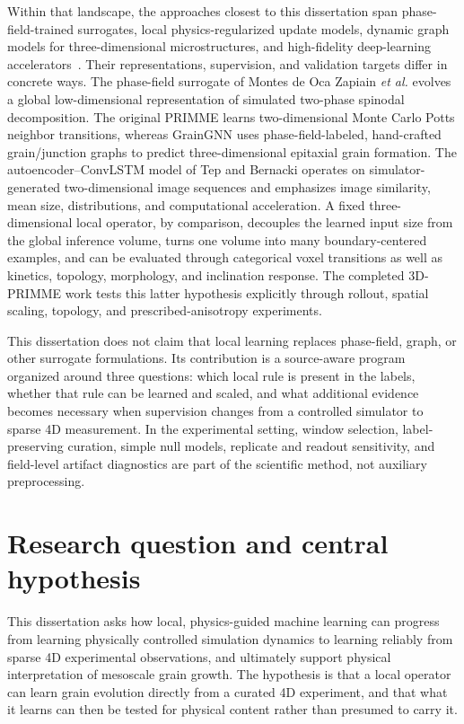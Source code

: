 \documentclass[proposalMode]{ufdissertation}
\begin{document}
Within that landscape, the approaches closest to this dissertation span phase-field-trained surrogates, local physics-regularized update models, dynamic graph models for three-dimensional microstructures, and high-fidelity deep-learning accelerators~\cite{montes2021surrogate,yan2022primme,qin2024graingnn,tep2025grain}. Their representations, supervision, and validation targets differ in concrete ways. The phase-field surrogate of Montes de Oca Zapiain \emph{et al.} evolves a global low-dimensional representation of simulated two-phase spinodal decomposition. The original PRIMME learns two-dimensional Monte Carlo Potts neighbor transitions, whereas GrainGNN uses phase-field-labeled, hand-crafted grain/junction graphs to predict three-dimensional epitaxial grain formation. The autoencoder--ConvLSTM model of Tep and Bernacki operates on simulator-generated two-dimensional image sequences and emphasizes image similarity, mean size, distributions, and computational acceleration. A fixed three-dimensional local operator, by comparison, decouples the learned input size from the global inference volume, turns one volume into many boundary-centered examples, and can be evaluated through categorical voxel transitions as well as kinetics, topology, morphology, and inclination response. The completed 3D-PRIMME work tests this latter hypothesis explicitly through rollout, spatial scaling, topology, and prescribed-anisotropy experiments.

This dissertation does not claim that local learning replaces phase-field, graph, or other surrogate formulations. Its contribution is a source-aware program organized around three questions: which local rule is present in the labels, whether that rule can be learned and scaled, and what additional evidence becomes necessary when supervision changes from a controlled simulator to sparse 4D measurement. In the experimental setting, window selection, label-preserving curation, simple null models, replicate and readout sensitivity, and field-level artifact diagnostics are part of the scientific method, not auxiliary preprocessing.

\section{Research question and central hypothesis}

This dissertation asks how local, physics-guided machine learning can progress from learning physically controlled simulation dynamics to learning reliably from sparse 4D experimental observations, and ultimately support physical interpretation of mesoscale grain growth. The hypothesis is that a local operator can learn grain evolution directly from a curated 4D experiment, and that what it learns can then be tested for physical content rather than presumed to carry it.
\end{document}
